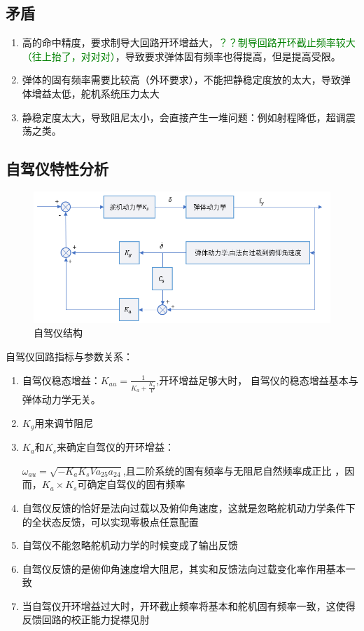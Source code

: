 \subsection{矛盾}
\begin{enumerate}
    \item 高的命中精度，要求制导大回路开环增益大，\textcolor{green}{？？制导回路开环截止频率较大（往上抬了，对对对）}，导致要求弹体固有频率也得提高，但是提高受限。
    \item 弹体的固有频率需要比较高（外环要求），不能把静稳定度放的太大，导致弹体增益太低，舵机系统压力太大
    \item 静稳定度太大，导致阻尼太小，会直接产生一堆问题：例如射程降低，超调震荡之类。
\end{enumerate}
\subsection{自驾仪特性分析}
\begin{figure}[H]
    \centering
    \includegraphics[scale = 0.7]{pictures/chapter10/1}
    \caption{自驾仪结构}
    \label{autopliot}
\end{figure}

{\heiti 自驾仪回路指标与参数关系：}

\begin{enumerate}
    \item 自驾仪稳态增益：$K_{au} = \frac{1}{K_a+\frac{K_g}{V}}$,开环增益足够大时，
    自驾仪的稳态增益基本与弹体动力学无关。
    \item $K_g$用来调节阻尼
    \item $K_a$和$K_s$来确定自驾仪的开环增益：
    
    {\kaishu $\omega_{au} = \sqrt{-K_aK_sVa_{25}a_{24}}$,且二阶系统的固有频率与无阻尼自然频率成正比
    ，因而，$K_a\times K_s$可确定自驾仪的固有频率}
    \item 自驾仪反馈的恰好是法向过载以及俯仰角速度，这就是忽略舵机动力学条件下的全状态反馈，可以实现零极点任意配置
    \item 自驾仪不能忽略舵机动力学的时候变成了输出反馈
    \item 自驾仪反馈的是俯仰角速度增大阻尼，其实和反馈法向过载变化率作用基本一致
    \item 当自驾仪开环增益过大时，开环截止频率将基本和舵机固有频率一致，这使得反馈回路的校正能力捉襟见肘
\end{enumerate}
